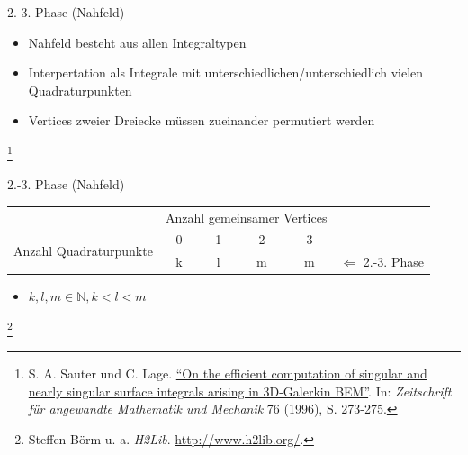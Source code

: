 \documentclass[10pt]{beamer}
\let\svthefootnote\thefootnote
\begin{document}
\begin{frame}{2.-3. Phase (Nahfeld)}
  \begin{itemize}
    \item Nahfeld besteht aus allen Integraltypen
    \item Interpertation als Integrale mit unterschiedlichen/unterschiedlich
          vielen Quadraturpunkten
    \item Vertices zweier Dreiecke müssen zueinander permutiert werden
  \end{itemize}
  
  \footnotesize
  \let\thefootnote\relax\footnote{S. A. Sauter und C. Lage.
  \href{https://link.springer.com/article/10.1007\%2Fs00211-015-0757-y}{
  ``On the efficient computation of singular and nearly singular surface 
  integrals arising in 3D-Galerkin BEM''}. In:   \textit{Zeitschrift f\"ur 
  angewandte Mathematik und Mechanik } 76 (1996), S. 273-275.}
  \addtocounter{footnote}{-1}\let\thefootnote\svthefootnote\relax
  \normalsize
\end{frame}

\begin{frame}{2.-3. Phase (Nahfeld)}
  \begin{tabular}{cccccc} \cmidrule[\heavyrulewidth]{1-5}
     & \multicolumn{4}{c}{Anzahl gemeinsamer Vertices} & \\ \cmidrule{2-5}
    \multirow{2}{*}{Anzahl Quadraturpunkte} & 0 & 1 & 2 & 3 & \\ \cmidrule{2-5}
     & k & l & m & m & \(\Leftarrow\) 2.-3. Phase\\
    \cmidrule[\heavyrulewidth]{1-5}
  \end{tabular}
  \begin{itemize}
    \item \(k, l, m \in \mathbb{N}, k < l < m\)
  \end{itemize}

  \footnotesize
  \let\thefootnote\relax\footnote{Steffen Börm u. a. \textit{H2Lib}.
  \url{http://www.h2lib.org/}.}
  \addtocounter{footnote}{-1}\let\thefootnote\svthefootnote\relax
  \normalsize
\end{frame}
\end{document}
